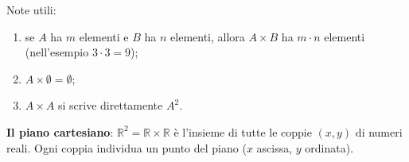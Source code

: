 \documentclass[11pt,a4paper]{article}
\theoremstyle{definition}
\begin{document}
Note utili:
\begin{enumerate}
    \item se $A$ ha $m$ elementi e $B$ ha $n$ elementi, allora
          $A \times B$ ha $m \cdot n$ elementi (nell'esempio $3 \cdot 3 = 9$);
    \item $A \times \emptyset = \emptyset$;
    \item $A \times A$ si scrive direttamente $A^2$.
\end{enumerate}

\textbf{Il piano cartesiano}: $\mathbb{R}^2 = \mathbb{R} \times \mathbb{R}$
è l'insieme di tutte le coppie $(x, y)$ di numeri reali. Ogni coppia
individua un punto del piano ($x$ ascissa, $y$ ordinata).
\end{document}
